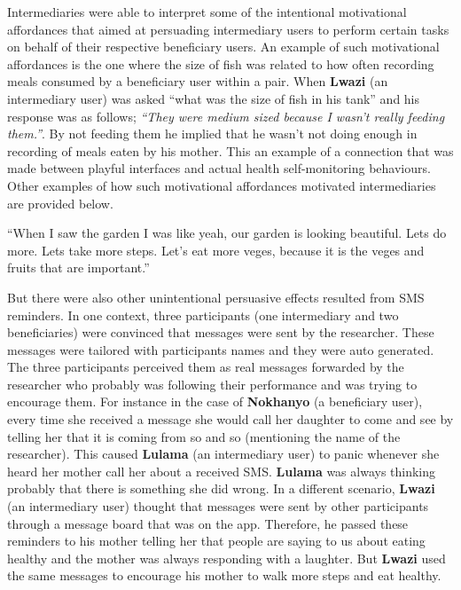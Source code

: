 Intermediaries were able to interpret some of the intentional motivational affordances that aimed at persuading intermediary users to perform certain tasks on behalf of their respective beneficiary users. An example of such motivational affordances is the one where the size of fish was related to how often recording meals consumed by a beneficiary user within a pair. When \textbf{Lwazi} (an intermediary user) was asked ``what was the size of fish in his tank'' and his response was as follows; \emph{``They were medium sized because I wasn't really feeding them.''}. By not feeding them he implied that he wasn't not doing enough in recording of meals eaten by his mother. This an example of a connection that was made between playful interfaces and actual health self-monitoring behaviours. Other examples of how such motivational affordances motivated intermediaries are provided below.


 {``When I saw the garden I was like yeah, our garden is looking beautiful. Lets do more. Lets take more steps. Let's eat more veges, because it is the veges and fruits that are important.''}

But there were also other unintentional persuasive effects resulted from SMS reminders. In one context, three participants (one intermediary and two beneficiaries) were convinced that messages were sent by the researcher. These messages were tailored with participants names and they were auto generated.  The three participants perceived them as real messages forwarded by the researcher who probably was following their performance and was trying to encourage them. For instance in the case of \textbf{Nokhanyo} (a beneficiary user), every time she received a message she would call her daughter to come and see by telling her that it is coming from so and so (mentioning the name of the researcher). This caused \textbf{Lulama} (an intermediary user) to panic whenever she heard her mother call her about a received SMS. \textbf{Lulama} was always thinking probably that there is something she did wrong.  In a different scenario, \textbf{Lwazi} (an intermediary user) thought that messages were sent by other participants through a message board that was on the app. Therefore, he passed these reminders to his mother telling her that people are saying to us about eating healthy and the mother was always responding with a laughter. But \textbf{Lwazi} used the same messages to encourage his mother to walk more steps and eat healthy.  

